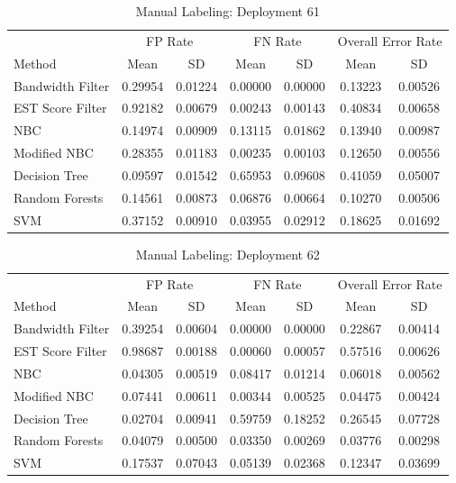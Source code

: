 \documentclass[twoside]{article}
\begin{document}
\begin{table}[H]
\caption{Manual Labeling: Deployment 61}
\centering
\begin{tabular}{lcccccc}
\toprule
\multicolumn{1}{c}{ } 
&\multicolumn{2}{c}{FP Rate } 
&\multicolumn{2}{c}{FN Rate } 
&\multicolumn{2}{c}{Overall Error Rate } \\
\cmidrule(r){2-3}
\cmidrule(r){4-5}
\cmidrule(r){6-7}
Method& Mean & SD & Mean & SD & Mean & SD \\
\midrule
Bandwidth Filter & 0.29954 & 0.01224 & 0.00000 & 0.00000 & 0.13223 & 0.00526 \\
EST Score Filter & 0.92182 & 0.00679 & 0.00243 & 0.00143 & 0.40834 & 0.00658 \\
NBC & 0.14974 & 0.00909 & 0.13115 & 0.01862 & 0.13940 & 0.00987 \\
Modified NBC & 0.28355 & 0.01183 & 0.00235 & 0.00103 & 0.12650 & 0.00556 \\
Decision Tree & 0.09597 & 0.01542 & 0.65953 & 0.09608 & 0.41059 & 0.05007 \\
Random Forests & 0.14561 & 0.00873 & 0.06876 & 0.00664 & 0.10270 & 0.00506 \\
SVM & 0.37152 & 0.00910 & 0.03955 & 0.02912 & 0.18625 & 0.01692 \\
\bottomrule
\end{tabular}
\end{table}

\begin{table}[H]
\caption{Manual Labeling: Deployment 62}
\centering
\begin{tabular}{lcccccc}
\toprule
\multicolumn{1}{c}{ } 
&\multicolumn{2}{c}{FP Rate } 
&\multicolumn{2}{c}{FN Rate } 
&\multicolumn{2}{c}{Overall Error Rate } \\
\cmidrule(r){2-3}
\cmidrule(r){4-5}
\cmidrule(r){6-7}
Method& Mean & SD & Mean & SD & Mean & SD \\
\midrule
Bandwidth Filter & 0.39254 & 0.00604 & 0.00000 & 0.00000 & 0.22867 & 0.00414 \\
EST Score Filter & 0.98687 & 0.00188 & 0.00060 & 0.00057 & 0.57516 & 0.00626 \\
NBC & 0.04305 & 0.00519 & 0.08417 & 0.01214 & 0.06018 & 0.00562 \\
Modified NBC & 0.07441 & 0.00611 & 0.00344 & 0.00525 & 0.04475 & 0.00424 \\
Decision Tree & 0.02704 & 0.00941 & 0.59759 & 0.18252 & 0.26545 & 0.07728 \\
Random Forests & 0.04079 & 0.00500 & 0.03350 & 0.00269 & 0.03776 & 0.00298 \\
SVM & 0.17537 & 0.07043 & 0.05139 & 0.02368 & 0.12347 & 0.03699 \\
\bottomrule
\end{tabular}
\end{table}
\end{document}
